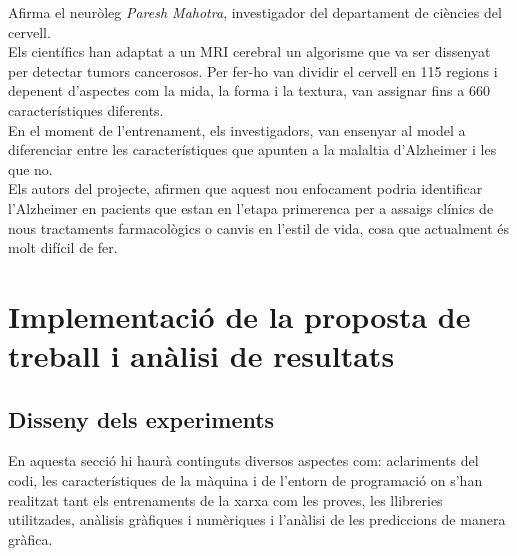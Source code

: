 \documentclass[a4paper,12pt]{article}
\begin{document}
\begin{center}
\begin{minipage}{0.9\linewidth}
{\begin{center}
\begin{minipage}{0.9\linewidth}
{                    }
                    \vspace{20pt}
                \end{minipage}
            \end{center}
            Afirma el neuròleg \textit{Paresh Mahotra}, investigador del departament de ciències del cervell.\\
            Els científics han adaptat a un MRI cerebral un algorisme que va ser dissenyat per detectar tumors cancerosos. Per fer-ho van dividir el cervell en 115 regions i depenent d'aspectes com la mida, la forma i la textura, van assignar fins a 660 característiques diferents.\\
            En el moment de l'entrenament, els investigadors, van ensenyar al model a diferenciar entre les característiques que apunten a la malaltia d'Alzheimer i les que no.\\
            Els autors del projecte, afirmen que aquest nou enfocament podria identificar l'Alzheimer en pacients que estan en l'etapa primerenca per a assaigs clínics de nous tractaments farmacològics o canvis en l'estil de vida, cosa que actualment és molt difícil de fer.
        }
        \vspace{5pt}
    \end{minipage}
\end{center}

\section*{Implementació de la proposta de treball i anàlisi de resultats}
\subsection*{Disseny dels experiments}
 En aquesta secció hi haurà continguts diversos aspectes com: aclariments del codi, les característiques de la màquina i de l'entorn de programació on s'han realitzat tant els entrenaments de la xarxa com les proves, les llibreries utilitzades, anàlisis gràfiques i numèriques i l'anàlisi de les prediccions de manera gràfica.
\end{document}
